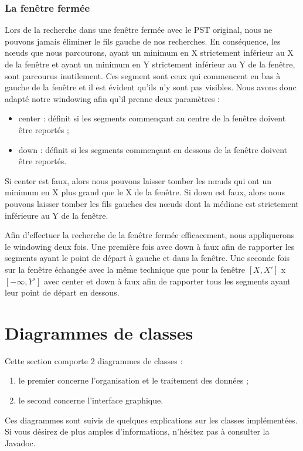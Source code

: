 \documentclass[10pt,a4paper]{article}
\begin{document}
\subsubsection{La fenêtre fermée}
Lors de la recherche dans une fenêtre fermée avec le PST original, nous ne pouvons jamais éliminer le fils gauche de nos recherches. En conséquence, les nœuds que nous parcourons, ayant un minimum en X strictement inférieur au X de la fenêtre et ayant un minimum en Y strictement inférieur au Y de la fenêtre, sont parcourus inutilement. Ces segment sont ceux qui commencent en bas à gauche de la fenêtre et il est évident qu'ils n'y sont pas visibles. Nous avons donc adapté notre windowing afin qu'il prenne deux paramètres :
\begin{itemize}
	\item center : définit si les segments commençant au centre de la fenêtre doivent être reportés ;
	\item down : définit si les segments commençant en dessous de la fenêtre doivent être reportés.
\end{itemize}
Si center est faux, alors nous pouvons laisser tomber les nœuds qui ont un minimum en X plus grand que le X de la fenêtre.
Si down est faux, alors nous pouvons laisser tomber les fils gauches des nœuds dont la médiane est strictement inférieure au Y de la fenêtre.

Afin d'effectuer la recherche de la fenêtre fermée efficacement, nous appliquerons le windowing deux fois. Une première fois avec down à faux afin de rapporter les segments ayant le point de départ à gauche et dans la fenêtre. Une seconde fois sur la fenêtre échangée avec la même technique que pour la fenêtre $[X, X']$ x $[-\infty, Y']$ avec center et down à faux afin de rapporter tous les segments ayant leur point de départ en dessous.

\newpage
\section{Diagrammes de classes}
Cette section comporte 2 diagrammes de classes :
\begin{enumerate}
	\item le premier concerne l'organisation et le traitement des données ;
	\item le second concerne l'interface graphique.
\end{enumerate}
Ces diagrammes sont suivis de quelques explications sur les classes implémentées. Si vous désirez de plus amples d'informations, n'hésitez pas à consulter la Javadoc.
\end{document}
